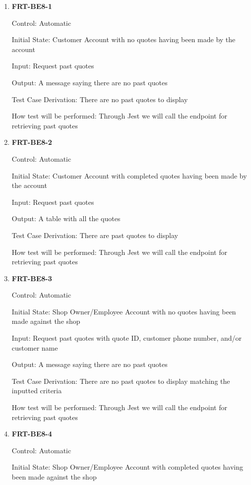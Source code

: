 \documentclass[12pt, titlepage]{article}
\begin{document}
\begin{enumerate}

	\item \textbf{FRT-BE8-1}

	      Control: Automatic

	      Initial State: Customer Account with no quotes having been made by the account

	      Input: Request past quotes

	      Output: A message saying there are no past quotes

	      Test Case Derivation: There are no past quotes to display

	      How test will be performed: Through Jest we will call the endpoint for retrieving past quotes

	\item \textbf{FRT-BE8-2}

	      Control: Automatic

	      Initial State: Customer Account with completed quotes having been made by the account

	      Input: Request past quotes

	      Output: A table with all the quotes

	      Test Case Derivation: There are past quotes to display

	      How test will be performed: Through Jest we will call the endpoint for retrieving past quotes

	\item \textbf{FRT-BE8-3}

	      Control: Automatic

	      Initial State: Shop Owner/Employee Account with no quotes having been made against the shop

	      Input: Request past quotes with quote ID, customer phone number, and/or customer name

	      Output: A message saying there are no past quotes

	      Test Case Derivation: There are no past quotes to display matching the inputted criteria

	      How test will be performed: Through Jest we will call the endpoint for retrieving past quotes

	\item \textbf{FRT-BE8-4}

	      Control: Automatic

	      Initial State: Shop Owner/Employee Account with completed quotes having been made against the shop


\end{enumerate}
\end{document}
